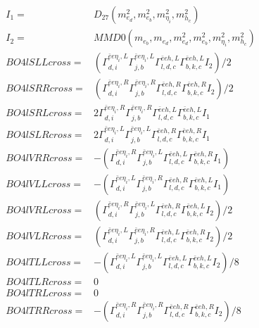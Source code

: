 \documentclass[A4,landscape]{article}
\begin{document}
\begin{align} 
I_1 = & D_{27}(m^2_{e_{{d}}}, m^2_{e_{{b}}}, m^2_{\eta_i}, m^2_{h_{{c}}}) \\ 
I_2 = & MMD0(m_{e_{{b}}}, m_{e_{{d}}}, m^2_{e_{{d}}}, m^2_{e_{{b}}}, m^2_{\eta_i}, m^2_{h_{{c}}}) \\ 
  BO4lSLLcross= & ( \Gamma^{\bar{e}e \eta_i ,L}_{d, i} \Gamma^{\bar{e}e \eta_i ,L}_{j, b} \Gamma^{\bar{e}e h ,L}_{l, d, c} \Gamma^{\bar{e}e h ,L}_{b, k, c} I_2)/2 \\ 
  BO4lSRRcross= & ( \Gamma^{\bar{e}e \eta_i ,R}_{d, i} \Gamma^{\bar{e}e \eta_i ,R}_{j, b} \Gamma^{\bar{e}e h ,R}_{l, d, c} \Gamma^{\bar{e}e h ,R}_{b, k, c} I_2)/2 \\ 
  BO4lSRLcross= & 2  \Gamma^{\bar{e}e \eta_i ,R}_{d, i} \Gamma^{\bar{e}e \eta_i ,R}_{j, b} \Gamma^{\bar{e}e h ,L}_{l, d, c} \Gamma^{\bar{e}e h ,L}_{b, k, c} I_1 \\ 
  BO4lSLRcross= & 2  \Gamma^{\bar{e}e \eta_i ,L}_{d, i} \Gamma^{\bar{e}e \eta_i ,L}_{j, b} \Gamma^{\bar{e}e h ,R}_{l, d, c} \Gamma^{\bar{e}e h ,R}_{b, k, c} I_1 \\ 
  BO4lVRRcross= & -( \Gamma^{\bar{e}e \eta_i ,R}_{d, i} \Gamma^{\bar{e}e \eta_i ,L}_{j, b} \Gamma^{\bar{e}e h ,L}_{l, d, c} \Gamma^{\bar{e}e h ,R}_{b, k, c} I_1) \\ 
  BO4lVLLcross= & -( \Gamma^{\bar{e}e \eta_i ,L}_{d, i} \Gamma^{\bar{e}e \eta_i ,R}_{j, b} \Gamma^{\bar{e}e h ,R}_{l, d, c} \Gamma^{\bar{e}e h ,L}_{b, k, c} I_1) \\ 
  BO4lVRLcross= & ( \Gamma^{\bar{e}e \eta_i ,R}_{d, i} \Gamma^{\bar{e}e \eta_i ,L}_{j, b} \Gamma^{\bar{e}e h ,R}_{l, d, c} \Gamma^{\bar{e}e h ,L}_{b, k, c} I_2)/2 \\ 
  BO4lVLRcross= & ( \Gamma^{\bar{e}e \eta_i ,L}_{d, i} \Gamma^{\bar{e}e \eta_i ,R}_{j, b} \Gamma^{\bar{e}e h ,L}_{l, d, c} \Gamma^{\bar{e}e h ,R}_{b, k, c} I_2)/2 \\ 
  BO4lTLLcross= & -( \Gamma^{\bar{e}e \eta_i ,L}_{d, i} \Gamma^{\bar{e}e \eta_i ,L}_{j, b} \Gamma^{\bar{e}e h ,L}_{l, d, c} \Gamma^{\bar{e}e h ,L}_{b, k, c} I_2)/8 \\ 
  BO4lTLRcross= & 0 \\ 
  BO4lTRLcross= & 0 \\ 
  BO4lTRRcross= & -( \Gamma^{\bar{e}e \eta_i ,R}_{d, i} \Gamma^{\bar{e}e \eta_i ,R}_{j, b} \Gamma^{\bar{e}e h ,R}_{l, d, c} \Gamma^{\bar{e}e h ,R}_{b, k, c} I_2)/8 \\ 
\end{align} 
\end{document}
